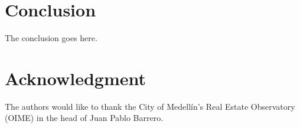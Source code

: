 \documentclass[journal]{IEEEtran}
\begin{document}
\section{Conclusion}
The conclusion goes here.






%


%
%
%


\section*{Acknowledgment}


The authors would like to thank the City of Medellín's Real Estate Observatory (OIME) in the head of Juan Pablo Barrero. 
\end{document}
